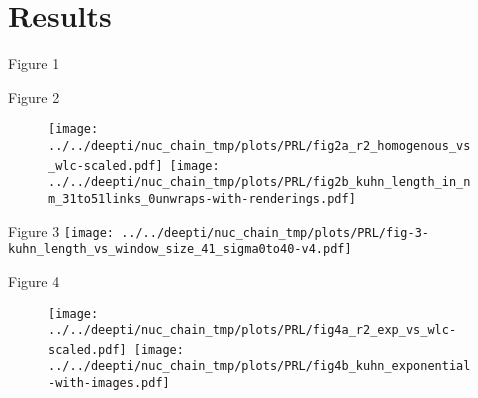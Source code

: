 \documentclass[10pt]{beamer}
\begin{document}
    \section{Results}

\begin{frame}{Figure 1}
\begin{figure}[t]
    \centering
    \hspace{2em}
\end{figure}
\end{frame}

\begin{frame}{Figure 2}
\begin{figure}
    \centering
    \mbox{\texttt{[image: ../../deepti/nuc\_chain\_tmp/plots/PRL/fig2a\_r2\_homogenous\_vs\_wlc-scaled.pdf]}
    \texttt{[image: ../../deepti/nuc\_chain\_tmp/plots/PRL/fig2b\_kuhn\_length\_in\_nm\_31to51links\_0unwraps-with-renderings.pdf]}}
\end{figure}
\end{frame}

\begin{frame}{Figure 3}
    \centering
    \texttt{[image: ../../deepti/nuc\_chain\_tmp/plots/PRL/fig-3-kuhn\_length\_vs\_window\_size\_41\_sigma0to40-v4.pdf]}
\end{frame}

\begin{frame}{Figure 4}
\begin{figure}
    \centering
    \mbox{\texttt{[image: ../../deepti/nuc\_chain\_tmp/plots/PRL/fig4a\_r2\_exp\_vs\_wlc-scaled.pdf]}
    \texttt{[image: ../../deepti/nuc\_chain\_tmp/plots/PRL/fig4b\_kuhn\_exponential-with-images.pdf]}}
\end{figure}
\end{frame}
\end{document}
